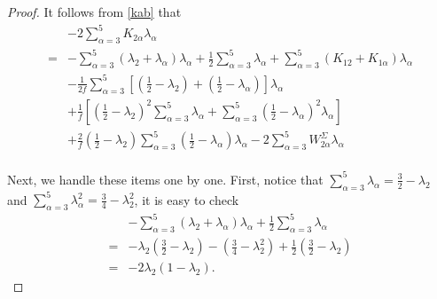 \documentclass[10pt,a4paper]{amsart}
\begin{document}
\begin{proof}
It follows from \eqref{kab} that
\begin{equation*}
	\begin{aligned}
		&-2\sum_{\alpha=3}^5K_{2\alpha}\lambda_\alpha\\
		 =&-\sum_{\alpha=3}^5(\lambda_{2}+\lambda_{\alpha})\lambda_\alpha+\frac{1}{2}\sum_{\alpha=3}^5\lambda_\alpha+\sum_{\alpha=3}^5(K_{12}+K_{1\alpha })\lambda_\alpha\\
		&-{\frac{1}{2f}}\sum_{\alpha=3}^5\left[ ({\frac{1}{2}}-\lambda_{2})+({\frac{1}{2}}-\lambda_{\alpha})\right] \lambda_\alpha\\
		&+\frac{1}{f}\left[({\frac{1}{2}}-\lambda_{2})^2\sum_{\alpha=3}^5\lambda_{\alpha}+ \sum_{\alpha=3}^5({\frac{1}{2}}-\lambda_{\alpha})^2 \lambda_{\alpha}\right]\\
		&+\frac{2}{f}({\frac{1}{2}}-\lambda_{2})\sum_{\alpha=3}^5({\frac{1}{2}}-\lambda_{\alpha})\lambda_{\alpha}
		-2\sum_{\alpha=3}^5W^{\Sigma}_{2\alpha}\lambda_{\alpha}\\
	\end{aligned}
\end{equation*}

Next, we handle these items one by one. First, notice that $\sum_{\alpha=3}^5\lambda_\alpha=\frac{3}{2}-\lambda_2$ and $\sum_{\alpha=3}^5\lambda_\alpha^2=\frac{3}{4}-\lambda_2^2$, it is easy to check
\begin{equation*}
	\begin{aligned}
		&-\sum_{\alpha=3}^5(\lambda_{2}+\lambda_{\alpha})\lambda_\alpha+\frac{1}{2}\sum_{\alpha=3}^5\lambda_\alpha\\
		=&-\lambda_{2}(\frac{3}{2}-\lambda_{2})-(\frac{3}{4}-\lambda_{2}^2)+\frac{1}{2}(\frac{3}{2}-\lambda_{2})\\
		=&-2\lambda_{2}(1-\lambda_{2}).
	\end{aligned}
\end{equation*}


\end{proof}
\end{document}
